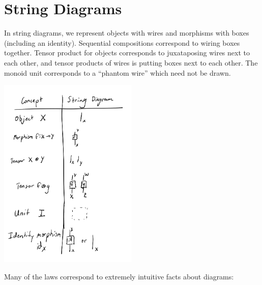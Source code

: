 \section{String Diagrams}

In string diagrams, we represent objects with wires and morphisms with
boxes (including an identity). Sequential compositions correspond to
wiring boxes together. Tensor product for objects corresponds to
juxataposing wires next to each other, and tensor products of wires is
putting boxes next to each other. The monoid unit corresponds to a
``phantom wire'' which need not be drawn.

\begin{center}
  \includegraphics[width=250px]{fig/monoidal-categories-concepts.png}
\end{center}
Many of the laws correspond to extremely intuitive facts about diagrams:

